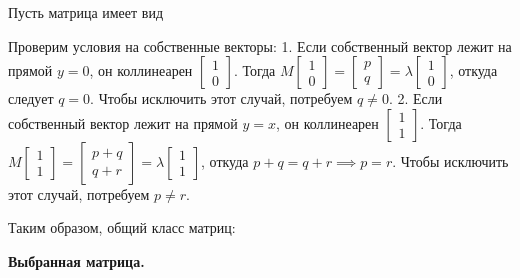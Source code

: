 \documentclass[a4paper,14pt]{extarticle}
\begin{document}
Пусть матрица имеет вид
\begin{center}\end{center}

Проверим условия на собственные векторы: 1. Если собственный вектор
лежит на прямой \(y = 0\), он коллинеарен
\(\begin{bmatrix} 1 \\ 0 \end{bmatrix}\). Тогда
\(M \begin{bmatrix} 1 \\ 0 \end{bmatrix} = \begin{bmatrix} p \\ q \end{bmatrix} = \lambda \begin{bmatrix} 1 \\ 0 \end{bmatrix}\),
откуда следует \(q = 0\). Чтобы исключить этот случай, потребуем
\(q \neq 0\). 2. Если собственный вектор лежит на прямой \(y = x\), он
коллинеарен \(\begin{bmatrix} 1 \\ 1 \end{bmatrix}\). Тогда
\(M \begin{bmatrix} 1 \\ 1 \end{bmatrix} = \begin{bmatrix} p+q \\ q+r \end{bmatrix} = \lambda \begin{bmatrix} 1 \\ 1 \end{bmatrix}\),
откуда \(p+q = q+r \implies p = r\). Чтобы исключить этот случай,
потребуем \(p \neq r\).

Таким образом, общий класс матриц:
\begin{center}\end{center}

\textbf{Выбранная матрица.}
\end{document}
